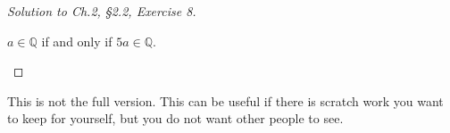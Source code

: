 \documentclass[12pt]{amsart}
\numberwithin{equation}{section}
\theoremstyle{definition}
\theoremstyle{remark}
\newif\ifnotes
\begin{document}
\begin{proof}[Solution to Ch.2, \S 2.2,  Exercise 8]
\ 
\\ 

\begin{center}
$ \textit{a} \in \mathbb{Q} $ if and only if $ 5 \textit{a} \in \mathbb{Q} $.
\end{center}

\end{proof}





\ifnotes


\else
	This is not the full version.  This can be useful if there is scratch work you want to keep for yourself, but you do not want other people to see. 
\fi





\end{document}
